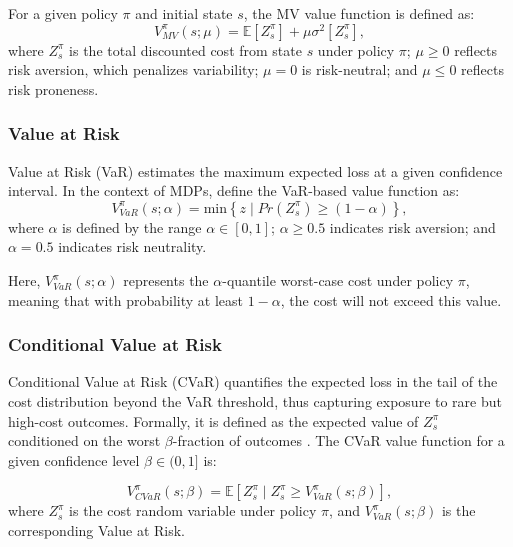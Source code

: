 \documentclass[runningheads]{llncs}
\begin{document}
For a given policy $\pi$ and initial state $s$, the MV value function is defined as:
\begin{equation}
    V^{\pi}_{MV}(s; \mu) =  
    \mathbb{E} [ Z^{\pi}_{s} ] + \mu \sigma^2 [Z^{\pi}_{s}],
\end{equation}
where $Z^{\pi}_s$ is the total discounted cost from state $s$ under policy $\pi$; $\mu \geq 0$ reflects risk aversion, which penalizes variability; $\mu = 0$ is risk-neutral; and $\mu \leq 0$ reflects risk proneness.

\subsubsection{Value at Risk}
Value at Risk (VaR) \cite{jorion2001value} estimates the maximum expected loss at a given confidence interval. In the context of MDPs, define the VaR-based value function as:
\begin{equation}
    V^{\pi}_{VaR}(s; \alpha) = \mbox{min} \left\{
    z \mid Pr(Z^{\pi}_{s}) \geq (1 - \alpha)
    \right\},
\end{equation}
where $\alpha$ is defined by the range $\alpha \in [0, 1]$; $\alpha \geq 0.5$ indicates risk aversion; and $\alpha = 0.5$ indicates risk neutrality.

Here, $V^{\pi}_{VaR}(s; \alpha)$ represents the $\alpha$-quantile worst-case cost under policy $\pi$, meaning that with probability at least $1 - \alpha$, the cost will not exceed this value.

\subsubsection{Conditional Value at Risk}
Conditional Value at Risk (CVaR) quantifies the expected loss in the tail of the cost distribution beyond the VaR threshold, thus capturing exposure to rare but high-cost outcomes. Formally, it is defined as the expected value of $Z^{\pi}_s$ conditioned on the worst $\beta$-fraction of outcomes \cite{chow2015risksensitive}. The CVaR value function for a given confidence level $\beta \in (0, 1]$ is:

\begin{equation}
    V^{\pi}_{CVaR}(s; \beta) = \mathbb{E} \left[
    Z^{\pi}_{s} \mid Z^{\pi}_{s} \geq V^{\pi}_{VaR}(s; \beta)
    \right],
\end{equation}
where $Z^{\pi}_s$ is the cost random variable under policy $\pi$, and $V^{\pi}_{VaR}(s; \beta)$ is the corresponding Value at Risk.
\end{document}

